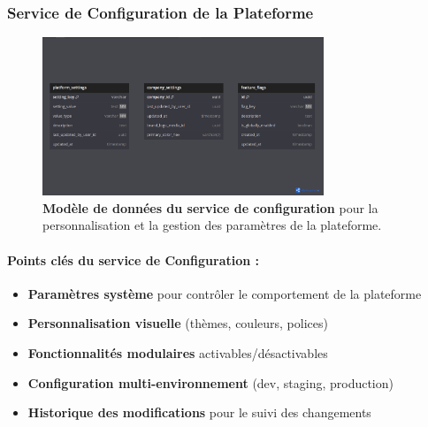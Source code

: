\subsubsection{Service de Configuration de la Plateforme}
\begin{figure}[H]
  \centering
  \includegraphics[width=0.75\textwidth,keepaspectratio]{week_1_img/services_db_screanshots/Screenshot 2025-06-06 at 15-08-44 Platform_Configuration_Service.pdf.png}
  \caption{\textbf{Modèle de données du service de configuration} pour la personnalisation et la gestion des paramètres de la plateforme.}
  \label{fig:config_service}
\end{figure}

\small
\paragraph{Points clés du service de Configuration :}
\begin{itemize}[leftmargin=*,noitemsep,topsep=0pt]
  \item \textbf{Paramètres système} pour contrôler le comportement de la plateforme
  \item \textbf{Personnalisation visuelle} (thèmes, couleurs, polices)
  \item \textbf{Fonctionnalités modulaires} activables/désactivables
  \item \textbf{Configuration multi-environnement} (dev, staging, production)
  \item \textbf{Historique des modifications} pour le suivi des changements
\end{itemize}
\normalsize

